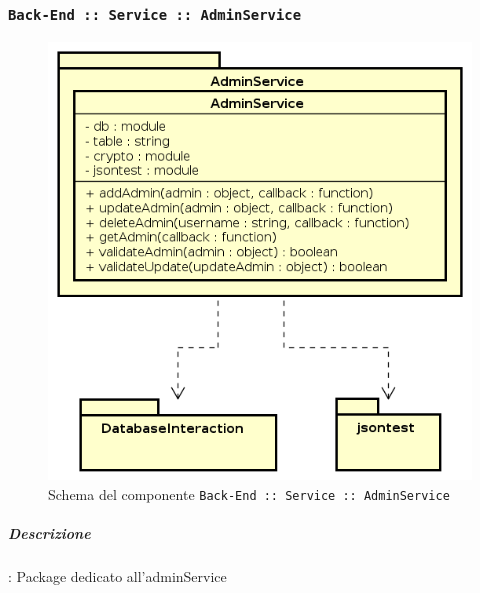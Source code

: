 \documentclass[../DefinizioneDiProdotto_v2.0.0.tex]{subfiles}
\begin{document}
\subsubsection{\texttt{Back-End :: Service :: AdminService}}
\begin{figure}[!h]
	\centering
	\includegraphics[scale=0.6]{Architettura/Back-End/Service/AdminService.png}
	\caption{Schema del componente \texttt{Back-End :: Service :: AdminService}}
\end{figure}
\subparagraph{Descrizione}: Package dedicato all'adminService
\end{document}
